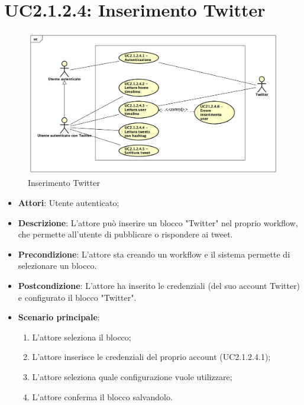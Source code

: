 \section{UC2.1.2.4: Inserimento Twitter}
\label{UC2.1.2.4}
\begin{figure}[h]
	\centering
	\includegraphics[scale=0.4]{Diagram/Twitter.png}
	\caption{Inserimento Twitter}\label{}
\end{figure}
\begin{itemize}
	\item \textbf{Attori}: Utente autenticato;
	\item \textbf{Descrizione}: L'attore può inserire un blocco "Twitter" nel proprio workflow, che permette all'utente di pubblicare o rispondere ai tweet.
	\item \textbf{Precondizione}: L'attore sta creando un workflow e il sistema permette di selezionare un blocco.
	\item \textbf{Postcondizione}: L'attore ha inserito le credenziali (del suo account Twitter) e configurato il blocco "Twitter".
	\item \textbf{Scenario principale}:
	\begin{enumerate} 
		\item L'attore seleziona il blocco;
		\item  L'attore inserisce le credenziali del proprio account (UC2.1.2.4.1);  
		\item  L'attore seleziona quale configurazione vuole utilizzare;
		\item L'attore conferma il blocco salvandolo.
	\end{enumerate}
\end{itemize}


